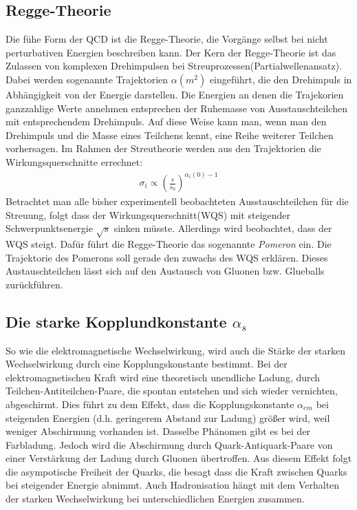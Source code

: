 \subsection{Regge-Theorie}
Die fühe Form der QCD ist die Regge-Theorie, die Vorgänge selbst bei nicht perturbativen Energien beschreiben kann. Der Kern der Regge-Theorie ist das Zulassen von komplexen Drehimpulsen bei Streuprozessen(Partialwellenansatz). Dabei werden sogenannte Trajektorien $\alpha(m^2)$ eingeführt, die den Drehimpuls in Abhängigkeit von der Energie darstellen. Die Energien an denen die Trajekorien ganzzahlige Werte annehmen entsprechen der Ruhemasse von Ausstauschteilchen mit entsprechendem Drehimpuls. Auf diese Weise kann man, wenn man den Drehimpuls und die Masse eines Teilchens kennt, eine Reihe weiterer Teilchen vorhersagen. Im Rahmen der Streutheorie werden aus den Trajektorien die Wirkungsquerschnitte errechnet: 
\begin{align*}
\sigma_{i} \propto \left(\frac{s}{s_0}\right)^{\alpha_i(0)-1}
\end{align*}
Betrachtet man alle bisher experimentell beobachteten Ausstauschteilchen für die Streuung, folgt dass der Wirkungsquerschnitt(WQS) mit steigender Schwerpunktsenergie $\sqrt{s}$ sinken müsste. Allerdings wird beobachtet, dass der WQS steigt. Dafür führt die Regge-Theorie das sogenannte \emph{Pomeron} ein. Die Trajektorie des Pomerons soll gerade den zuwachs des WQS erklären. Dieses Austauschteilchen lässt sich auf den Austausch von Gluonen bzw. Glueballs zurückführen. 
\subsection{Die starke Kopplundkonstante $\alpha_s$}
So wie die elektromagnetische Wechselwirkung, wird auch die Stärke der starken Wechselwirkung durch eine Kopplungskonstante bestimmt. Bei der elektromagnetischen Kraft wird eine theoretisch unendliche Ladung, durch Teilchen-Antiteilchen-Paare, die spontan entstehen und sich wieder vernichten, abgeschirmt. Dies führt zu dem Effekt, dass die Kopplungskonstante $\alpha_{em}$ bei steigenden Energien (d.h. geringerem Abstand zur Ladung) größer wird, weil weniger Abschirmung vorhanden ist. Dasselbe Phänomen gibt es bei der Farbladung. Jedoch wird die Abschirmung durch Quark-Antiquark-Paare von einer Verstärkung der Ladung durch Gluonen übertroffen. Aus diesem Effekt folgt die asympotische Freiheit der Quarks, die besagt dass die Kraft zwischen Quarks bei steigender Energie abnimmt. Auch Hadronisation hängt mit dem Verhalten der starken Wechselwirkung bei unterschiedlichen Energien zusammen.
